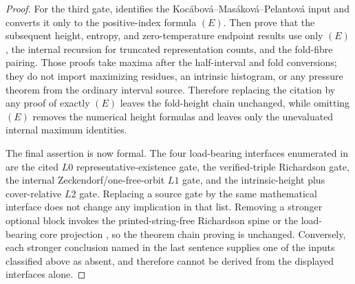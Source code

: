 \begin{proof}
For the third gate,  identifies
the Koc\'abov\'a--Mas\'akov\'a--Pelantov\'a input and converts it only to the
positive-index formula \((E)\).  Then
prove that the subsequent height, entropy, and zero-temperature endpoint results
use only \((E)\), the internal recursion for truncated representation counts, and
the fold-fibre pairing.  Those proofs take maxima after the half-interval and
fold conversions; they do not import maximizing residues, an intrinsic histogram,
or any pressure theorem from the ordinary interval source.  Therefore replacing
the citation by any proof of exactly \((E)\) leaves the fold-height chain
unchanged, while omitting \((E)\) removes the numerical height formulas and leaves
only the unevaluated internal maximum identities.

The final assertion is now formal.  The four load-bearing interfaces enumerated
in  are the cited \(L0\)
representative-existence gate, the verified-triple Richardson gate, the internal
Zeckendorf/one-free-orbit \(L1\) gate, and the intrinsic-height plus
cover-relative \(L2\) gate.  Replacing a source gate by the same mathematical
interface does not change any implication in that list.  Removing a stronger
optional block invokes the printed-string-free Richardson spine or the load-
bearing core projection
,
so the theorem chain proving  is unchanged.  Conversely,
each stronger conclusion named in the last sentence supplies one of the inputs
classified above as absent, and therefore cannot be derived from the displayed
interfaces alone.
\end{proof}

